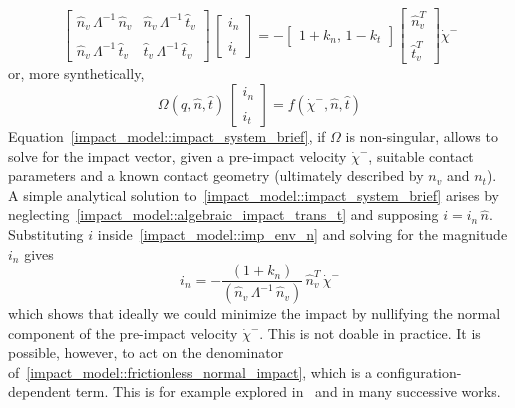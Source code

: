 \documentclass[letterpaper, 10 pt, conference]{ieeeconf}  %
\begin{document}
\begin{dmath}\label{impact_model::impact_system}
\begin{bmatrix}
\hat{n}_v\,\Lambda^{-1}\,\hat{n}_v & \hat{n}_v\,\Lambda^{-1}\,\hat{t}_v\\ \\
\hat{n}_v\,\Lambda^{-1}\,\hat{t}_v  &
\hat{t}_v\,\Lambda^{-1}\,\hat{t}_v 
\end{bmatrix}\,
\begin{bmatrix}
i_n\\ \\
i_t
\end{bmatrix} = -
\begin{bmatrix}
1 + k_n,\,1 - k_t
\end{bmatrix}
\begin{bmatrix}
\hat{n}_v^{T}\\ \\ \hat{t}_v^{T}
\end{bmatrix}
\dot{\chi}^{-}
\end{dmath}
or, more synthetically, 
\begin{equation}\label{impact_model::impact_system_brief}
\Omega(q, \hat{n}, \hat{t})\,\begin{bmatrix}
i_n\\ \\
i_t
\end{bmatrix} = f(\dot{\chi}^{-}, \hat{n}, \hat{t})
\end{equation}
Equation~\eqref{impact_model::impact_system_brief}, if $\Omega$ is non-singular, allows to solve for the impact vector, given a pre-impact velocity $\dot{\chi}^{-}$, suitable contact parameters and a known contact geometry (ultimately described by $n_v$ and $n_t$). \\
A simple analytical solution to~\eqref{impact_model::impact_system_brief} arises by neglecting~\eqref{impact_model::algebraic_impact_trans_t} and supposing $i = i_n\,\hat{n}$. Substituting $i$ inside~\eqref{impact_model::imp_env_n} and solving for the magnitude $i_n$ gives~\cite{impact_dyn::walker1994impact}
\begin{equation}\label{impact_model::frictionless_normal_impact}
i_n = - \dfrac{\left(1 + k_n\right)}{\left(\hat{n}_v\,\Lambda^{-1}\,\hat{n}_v\right)}\,\hat{n}_v^T\,\dot{\chi}^{-}
\end{equation}
which shows that ideally we could minimize the impact by nullifying the normal component of the pre-impact velocity $\dot{\chi}^{-}$. This is not doable in practice. It is possible, however, to act on the denominator of~\eqref{impact_model::frictionless_normal_impact}, which is a configuration-dependent term. This is for example explored in~\cite{impact_dyn::walker1994impact} and in many successive works.
\end{document}
